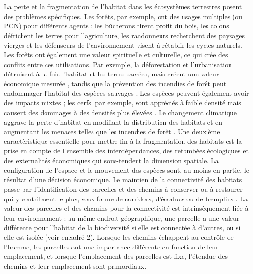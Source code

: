 \begin{displayquote}
\begin{displayquote}
\begin{displayquote}
La perte et la fragmentation de l'habitat dans les écosystèmes terrestres posent des problèmes spécifiques. Les forêts, par exemple, ont des usages multiples (ou PCN) pour différents agents : les bûcherons tirent profit du bois, les colons défrichent les terres pour l'agriculture, les randonneurs recherchent des paysages vierges et les défenseurs de l'environnement visent à rétablir les cycles naturels. Les forêts ont également une valeur spirituelle et culturelle, ce qui crée des conflits entre ces utilisations. Par exemple, la déforestation et l'urbanisation détruisent à la fois l'habitat et les terres sacrées, mais créent une valeur économique mesurée \citep{giglio_economics_2024}, tandis que la prévention des incendies de forêt peut endommager l'habitat des espèces sauvages \citep{bradshaw2018}. Les espèces peuvent également avoir des impacts mixtes ; les cerfs, par exemple, sont appréciés à faible densité mais causent des dommages à des densités plus élevées \citep{putman_identifying_2011}. 
Le changement climatique aggrave la perte d'habitat en modifiant la distribution des habitats et en augmentant les menaces telles que les incendies de forêt \citep{Dupuy2019ClimateCI,wasserman_climate_2023}.
    Une deuxième caractéristique essentielle pour mettre fin à la fragmentation des habitats est la prise en compte de l'ensemble des interdépendances, des retombées écologiques et des externalités économiques qui sous-tendent la dimension spatiale. La configuration de l'espace et le mouvement des espèces sont, au moins en partie, le résultat d'une décision économique.     Le maintien de la connectivité des habitats passe par l'identification des parcelles et des chemins à conserver ou à restaurer qui y contribuent le plus, sous forme de corridors, d'écoducs ou de tremplins \citep{Turner2005, Turner2011}. La valeur des parcelles et des chemins pour la connectivité est intrinsèquement liée à leur environnement : au même endroit géographique, une parcelle a une valeur différente pour l'habitat de la biodiversité si elle est connectée à d'autres, ou si elle est isolée (voir encadré 2). Lorsque les chemins échappent au contrôle de l'homme, les parcelles ont une importance différente en fonction de leur emplacement, et lorsque l'emplacement des parcelles est fixe, l'étendue des chemins et leur emplacement sont primordiaux.
\\

\end{displayquote}
\end{displayquote}
\end{displayquote}

